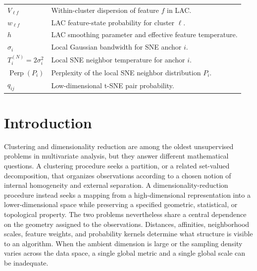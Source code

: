 \documentclass[11pt,a4paper]{article}
\newcommand{\Perp}{\operatorname{Perp}}
\theoremstyle{definition}
\theoremstyle{plain}
\begin{document}
\begin{longtable}{>{\raggedright\arraybackslash}p{} >{\raggedright\arraybackslash}p{}}
$V_{\ell f}$ & Within-cluster dispersion of feature $f$ in LAC.\\
$w_{\ell f}$ & LAC feature-state probability for cluster $\ell$.\\
$h$ & LAC smoothing parameter and effective feature temperature.\\
$\sigma_i$ & Local Gaussian bandwidth for SNE anchor $i$.\\
$T_i^{(N)}=2\sigma_i^2$ & Local SNE neighbor temperature for anchor $i$.\\
$\Perp(P_i)$ & Perplexity of the local SNE neighbor distribution $P_i$.\\
$q_{ij}$ & Low-dimensional t-SNE pair probability.\\
\bottomrule
\end{longtable}

\clearpage
\tableofcontents
\clearpage


\section{Introduction}
\label{sec:introduction}

Clustering and dimensionality reduction are among the oldest unsupervised problems in multivariate analysis, but they answer different mathematical questions. A clustering procedure seeks a partition, or a related set-valued decomposition, that organizes observations according to a chosen notion of internal homogeneity and external separation. A dimensionality-reduction procedure instead seeks a mapping from a high-dimensional representation into a lower-dimensional space while preserving a specified geometric, statistical, or topological property. The two problems nevertheless share a central dependence on the geometry assigned to the observations. Distances, affinities, neighborhood scales, feature weights, and probability kernels determine what structure is visible to an algorithm. When the ambient dimension is large or the sampling density varies across the data space, a single global metric and a single global scale can be inadequate.
\end{document}

